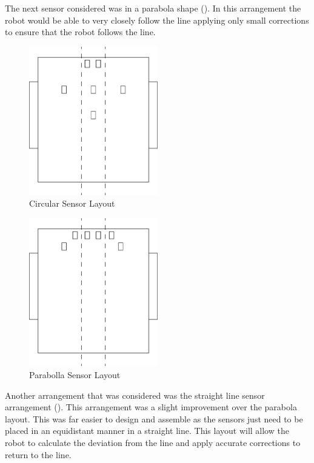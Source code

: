 \documentclass{article}
\begin{document}
The next sensor considered was in a parabola shape (). In this arrangement the robot would be able to very closely follow the line applying only small corrections to ensure that the robot follows the line.

\begin{figure}[!h]
\centerline{\includegraphics[width=0.5\textwidth]{circular_sensor}}
\caption{Circular Sensor Layout}
\label{fig:circular_sensor}
\end{figure}

\begin{figure}[!h]
\centerline{\includegraphics[width=0.5\textwidth]{parabola_sensor}}
\caption{Parabolla Sensor Layout}
\label{fig:parabola_sensor}
\end{figure}

Another arrangement that was considered was the straight line sensor arrangement (). This arrangement was a slight improvement over the parabola layout. This was far easier to design and assemble as the sensors just need to be placed in an equidistant manner in a straight line. This layout will allow the robot to calculate the deviation from the line and apply accurate corrections to return to the line.
\end{document}

